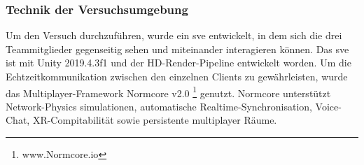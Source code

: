 \documentclass[a4paper,11pt]{article}%
\renewcommand{\\}{\vspace*{0.5\baselineskip} \newline}
\begin{document}
%

\subsubsection{Technik der Versuchsumgebung}
Um den Versuch durchzuführen, wurde ein \ac{sve} entwickelt, in dem sich die drei Teammitglieder gegenseitig sehen und miteinander interagieren können. Das \ac{sve} ist mit Unity 2019.4.3f1 und der HD-Render-Pipeline entwickelt worden. Um die Echtzeitkommunikation zwischen den einzelnen Clients zu gewährleisten, wurde das Multiplayer-Framework \dq{}Normcore v2.0\dq{} \footnote{www.Normcore.io} genutzt.
Normcore unterstützt Network-Physics simulationen, automatische Realtime-Synchronisation, Voice-Chat, XR-Compitabilität sowie persistente multiplayer Räume.	
\end{document}
